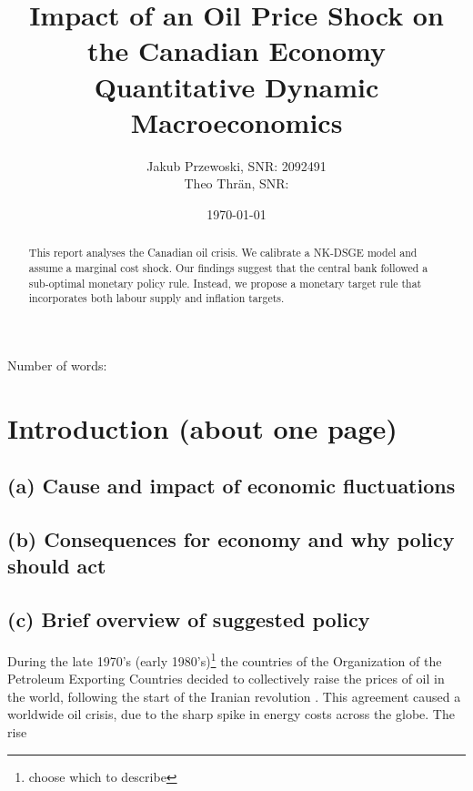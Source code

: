 \documentclass[12pt]{article}
\title{\textbf{Impact of an Oil Price Shock on the Canadian Economy} \\ \large{Quantitative Dynamic Macroeconomics}}
\author{Jakub Przewoski, SNR: 2092491\\ Theo Thrän, SNR: }
\date{\today}
\begin{document}
\maketitle
{}

\begin{center}
    \large
    Number of words:
    
    \vfill{}
    \begin{abstract}
        This report analyses the Canadian oil crisis. We calibrate a NK-DSGE model and assume a marginal cost shock. Our findings suggest that the central bank followed a sub-optimal monetary policy rule. Instead, we propose a monetary target rule that incorporates both labour supply and inflation targets. 
    \end{abstract}
\end{center}

\newpage

\tableofcontents{}

\newpage

\section{Introduction (about one page)}
\subsection*{(a) Cause and impact of economic fluctuations}

\subsection*{(b) Consequences for economy and why policy should act}

\subsection*{(c) Brief overview of suggested policy}

During the late 1970's (early 1980's)\footnote{choose which to describe} the countries of the Organization of the Petroleum Exporting Countries decided to collectively raise the prices of oil in the world, following the start of the Iranian revolution \parencite{OilSqueeze1979}. This agreement caused a worldwide oil crisis, due to the sharp spike in energy costs across the globe. The rise
\end{document}
